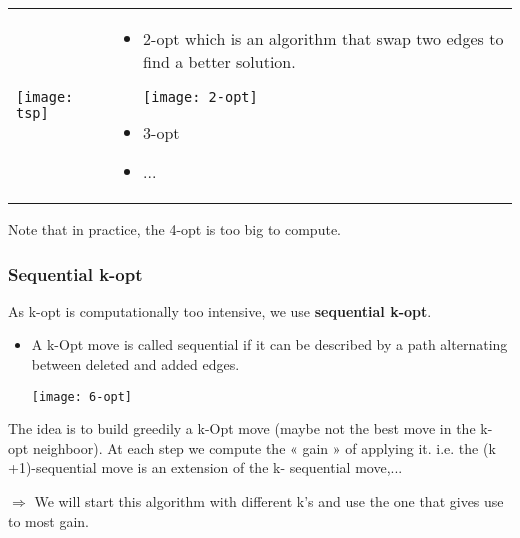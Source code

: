 \begin{tabular}{m{3.5cm}m{11cm}}
    \texttt{[image: tsp]}
    &
\begin{itemize}
    \item 2-opt which is an algorithm that swap two edges
        to find a better solution.
        \begin{center}
    \texttt{[image: 2-opt]}
        \end{center}
    \item 3-opt
    \item ...
    \end{itemize}
\end{tabular}
    Note that in practice, the 4-opt is too big to 
    compute.

\subsubsection{Sequential k-opt}

As k-opt is computationally too intensive, we
use \textbf{sequential k-opt}.

\begin{itemize}
    \item A k-Opt move is called sequential if it can be described
        by a path alternating between deleted and added
        edges.
        \begin{center}
    \texttt{[image: 6-opt]}
        \end{center}

\end{itemize}

The idea is to build greedily a k-Opt move (maybe not the best
move in the k-opt neighboor). At each
step we compute the « gain » of applying it. i.e. the (k
+1)-sequential move is an extension of the k-
sequential move,...

$\Rightarrow$ We will start this algorithm with different k's and use the one that gives use to most gain.


